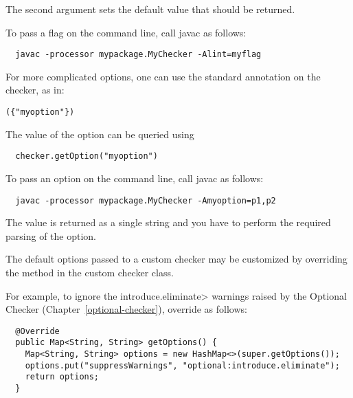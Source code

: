 The second argument sets the default value that should be returned.

To pass a flag on the command line, call javac as follows:

\begin{Verbatim}
  javac -processor mypackage.MyChecker -Alint=myflag
\end{Verbatim}



For more complicated options, one can use the standard
 annotation on the checker, as in:

\begin{alltt}
  (\{"myoption"\})
\end{alltt}

The value of the option can be queried using

\begin{Verbatim}
  checker.getOption("myoption")
\end{Verbatim}

To pass an option on the command line, call javac as follows:

\begin{Verbatim}
  javac -processor mypackage.MyChecker -Amyoption=p1,p2
\end{Verbatim}

The value is returned as a single string and you have to perform the
required parsing of the option.


The default options passed to a custom checker may be customized by overriding the
 method in the
custom checker class.

For example, to ignore the \<introduce.eliminate> warnings raised by the
Optional Checker (Chapter~\ref{optional-checker}), override
 as follows:

\begin{Verbatim}
  @Override
  public Map<String, String> getOptions() {
    Map<String, String> options = new HashMap<>(super.getOptions());
    options.put("suppressWarnings", "optional:introduce.eliminate");
    return options;
  }
\end{Verbatim}

